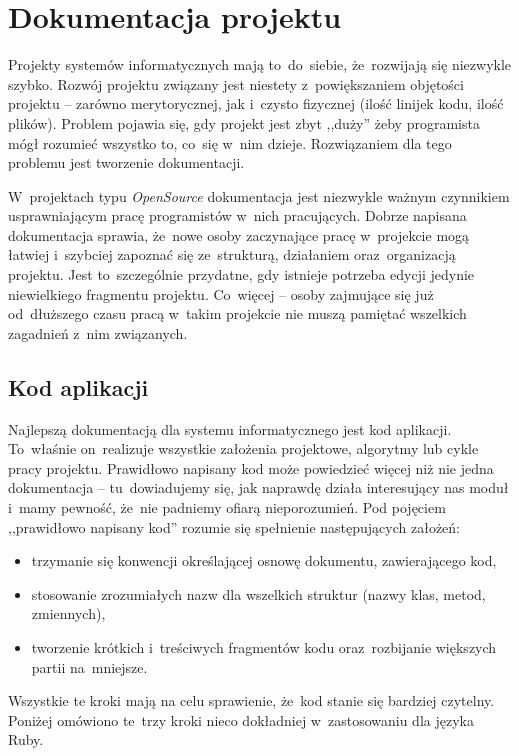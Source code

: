 \section{Dokumentacja projektu} \label{dokumentacja}

Projekty systemów informatycznych mają to~do~siebie, że~rozwijają się niezwykle szybko. Rozwój projektu związany jest niestety z~powiększaniem objętości projektu -- zarówno merytorycznej, jak i~czysto fizycznej (ilość linijek kodu, ilość plików). Problem pojawia się, gdy projekt jest zbyt ,,duży'' żeby programista mógł rozumieć wszystko to, co~się w~nim dzieje. Rozwiązaniem dla tego problemu jest tworzenie dokumentacji.


W~projektach typu \textit{OpenSource} dokumentacja jest niezwykle ważnym czynnikiem usprawniającym pracę programistów w~nich pracujących. Dobrze napisana dokumentacja sprawia, że~nowe osoby zaczynające pracę w~projekcie mogą łatwiej i~szybciej zapoznać się ze~strukturą, działaniem oraz~organizacją projektu. Jest to~szczególnie przydatne, gdy istnieje potrzeba edycji jedynie niewielkiego fragmentu projektu. Co~więcej -- osoby zajmujące się już od~dłuższego czasu pracą w~takim projekcie nie muszą pamiętać wszelkich zagadnień z~nim związanych.


\subsection{Kod aplikacji} \label{dokumentacja.kod}

Najlepszą dokumentacją dla systemu informatycznego jest kod aplikacji. To~właśnie on~realizuje wszystkie założenia projektowe, algorytmy lub cykle pracy projektu. Prawidłowo napisany kod może powiedzieć więcej niż nie jedna dokumentacja -- tu~dowiadujemy się, jak naprawdę działa interesujący nas moduł i~mamy pewność, że~nie padniemy ofiarą nieporozumień. Pod pojęciem ,,prawidłowo napisany kod'' rozumie się spełnienie następujących założeń:

\begin{itemize}
  \item trzymanie się konwencji określającej osnowę dokumentu, zawierającego kod,
  \item stosowanie zrozumiałych nazw dla wszelkich struktur (nazwy klas, metod, zmiennych),
  \item tworzenie krótkich i~treściwych fragmentów kodu oraz~rozbijanie większych partii na~mniejsze.
\end{itemize}

Wszystkie te kroki mają na celu sprawienie, że~kod stanie się bardziej czytelny. Poniżej omówiono te~trzy kroki nieco dokładniej w~zastosowaniu dla języka Ruby.


